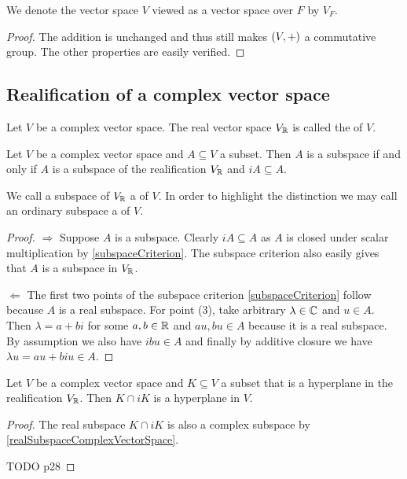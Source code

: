 We denote the vector space $V$ viewed as a vector space over $F$ by $V_F$.
\begin{proof}
The addition is unchanged and thus still makes $\sSet{V,+}$ a commutative group. The other properties are easily verified.
\end{proof}

\subsection{Realification of a complex vector space}
\begin{definition}
Let $V$ be a complex vector space. The real vector space $V_{\mathbb{R}}$ is called the  of $V$.
\end{definition}


\begin{lemma} \label{realSubspaceComplexVectorSpace}
Let $V$ be a complex vector space and $A\subseteq V$ a subset. Then $A$ is a subspace \textup{if and only if} $A$ is a subspace of the realification $V_{\mathbb{R}}$ and $iA \subseteq A$.
\end{lemma}
We call a subspace of $V_{\mathbb{R}}$ a  of $V$. In order to highlight the distinction we may call an ordinary subspace a  of $V$.
\begin{proof}
$\boxed{\Rightarrow}$ Suppose $A$ is a subspace. Clearly $iA \subseteq A$ as $A$ is closed under scalar multiplication by \ref{subspaceCriterion}. The subspace criterion also easily gives that $A$ is a subspace in $V_{\mathbb{R}}$.

$\boxed{\Leftarrow}$ The first two points of the subspace criterion \ref{subspaceCriterion} follow because $A$ is a real subspace. For point (3), take arbitrary $\lambda \in \mathbb{C}$ and $u\in A$. Then $\lambda = a+bi$ for some $a,b\in \mathbb{R}$ and $au,bu\in A$ because it is a real subspace. By assumption we also have $ibu\in A$ and finally by additive closure we have $\lambda u = au+biu \in A$.
\end{proof}

\begin{lemma} \label{realComplexHyperplane}
Let $V$ be a complex vector space and $K \subseteq V$ a subset that is a hyperplane in the realification $V_{\mathbb{R}}$. Then $K\cap iK$ is a hyperplane in $V$.
\end{lemma}
\begin{proof}
The real subspace $K\cap iK$ is also a complex subspace by \ref{realSubspaceComplexVectorSpace}.

TODO \cite{robertson_topological_1980} p28
\end{proof}

